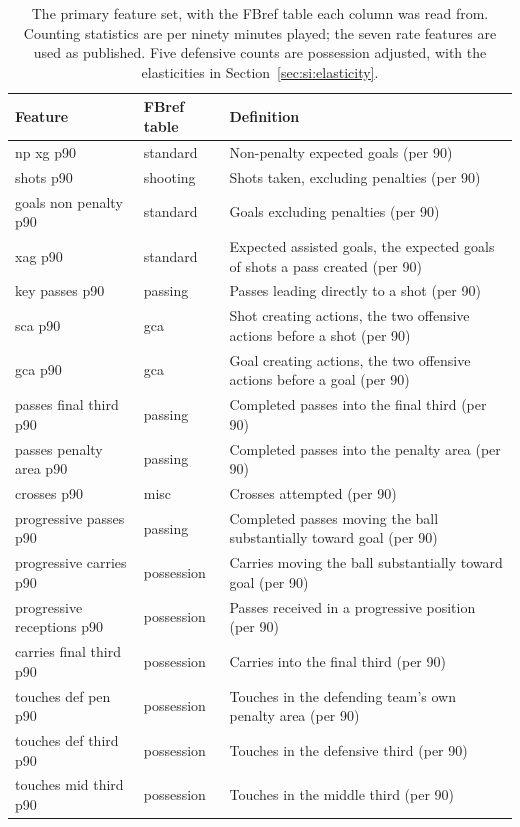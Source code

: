 \begin{table}[t]
\centering
\small
\caption{The primary feature set, with the FBref table each column was read from. Counting statistics are per ninety minutes played; the seven rate features are used as published. Five defensive counts are possession adjusted, with the elasticities in Section~\ref{sec:si:elasticity}.}
\label{tab:archivefeatures}
\begin{tabular}{llp{7.0cm}}
\toprule
Feature & FBref table & Definition \\
\midrule
np xg p90 & standard & Non-penalty expected goals (per 90) \\
shots p90 & shooting & Shots taken, excluding penalties (per 90) \\
goals non penalty p90 & standard & Goals excluding penalties (per 90) \\
xag p90 & standard & Expected assisted goals, the expected goals of shots a pass created (per 90) \\
key passes p90 & passing & Passes leading directly to a shot (per 90) \\
sca p90 & gca & Shot creating actions, the two offensive actions before a shot (per 90) \\
gca p90 & gca & Goal creating actions, the two offensive actions before a goal (per 90) \\
passes final third p90 & passing & Completed passes into the final third (per 90) \\
passes penalty area p90 & passing & Completed passes into the penalty area (per 90) \\
crosses p90 & misc & Crosses attempted (per 90) \\
progressive passes p90 & passing & Completed passes moving the ball substantially toward goal (per 90) \\
progressive carries p90 & possession & Carries moving the ball substantially toward goal (per 90) \\
progressive receptions p90 & possession & Passes received in a progressive position (per 90) \\
carries final third p90 & possession & Carries into the final third (per 90) \\
touches def pen p90 & possession & Touches in the defending team's own penalty area (per 90) \\
touches def third p90 & possession & Touches in the defensive third (per 90) \\
touches mid third p90 & possession & Touches in the middle third (per 90) \\

\end{tabular}
\end{table}
